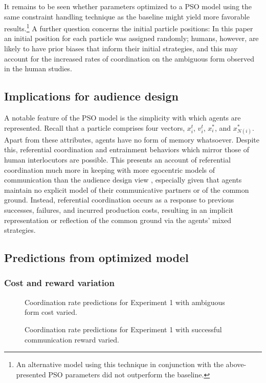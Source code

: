 \documentclass[a4paper,11pt]{article}
\begin{document}
It remains to be seen whether parameters optimized to a PSO model using the same constraint handling technique as the baseline might yield more favorable results.\footnote{An alternative model using this technique in conjunction with the above-presented PSO parameters did not outperform the baseline.} A further question concerns the initial particle positions: In this paper an initial position for each particle was assigned randomly; humans, however, are likely to have prior biases that inform their initial strategies, and this may account for the increased rates of coordination on the ambiguous form observed in the human studies.

\subsection{Implications for audience design}
A notable feature of the PSO model is the simplicity with which agents are represented. Recall that a particle comprises four vectors, $x_i^t$, $v_i^t$, $x_i^*$, and $x_{N(i)}^*$. Apart from these attributes, agents have no form of memory whatsoever. Despite this, referential coordination and entrainment behaviors which mirror those of human interlocutors are possible. This presents an account of referential coordination much more in keeping with more egocentric models of communication \cite{horton1996} than the audience design view \cite{clark1982}, especially given that agents maintain no explicit model of their communicative partners or of the common ground. Instead, referential coordination occurs as a response to previous successes, failures, and incurred production costs, resulting in an implicit representation or reflection of the common ground via the agents' mixed strategies. 


\subsection{Predictions from optimized model}
\subsubsection{Cost and reward variation}

\begin{figure}[t]
\centering
\scalebox{.475}{}
\caption{Coordination rate predictions for Experiment 1 with ambiguous form cost varied.}
\label{fig:3}
\end{figure}

\begin{figure}[t]
\centering
\scalebox{.475}{}
\caption{Coordination rate predictions for Experiment 1 with successful communication reward varied.}
\label{fig:4}
\end{figure}
\end{document}
